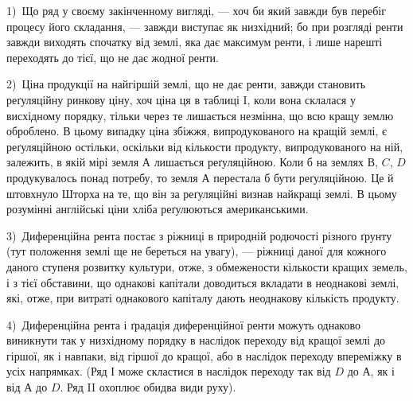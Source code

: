 
1)~Що ряд у своєму закінченному вигляді, — хоч би який завжди був перебіг процесу його складання, —
завжди виступає як низхідний; бо при розгляді ренти завжди виходять спочатку від землі, яка дає
максимум ренти, і лише нарешті переходять до тієї, що не дає жодної ренти.

2)~Ціна продукції на найгіршій землі, що не дає ренти, завжди становить реґуляційну ринкову ціну,
хоч ціна ця в таблиці I, коли вона склалася у висхідному порядку, тільки через те лишається
незмінна, що всю кращу землю оброблено. В цьому випадку ціна збіжжя, випродукованого на кращій
землі, є реґуляційною остільки, оскільки від кількости продукту, випродукованого на ній, залежить, в
якій мірі земля $А$ лишається реґуляційною. Коли б на землях $В$, $C$, $D$ продукувалось понад потребу, то
земля $А$ перестала б бути реґуляційною. Це й штовхнуло Шторха на те, що він за реґуляційні визнав
найкращі землі. В цьому розумінні англійські ціни хліба реґулюються американськими.

3)~Диференційна рента постає з ріжниці в природній родючості різного ґрунту (тут положення землі ще
не береться на увагу), — ріжниці даної для кожного даного ступеня розвитку культури, отже, з
обмежености кількости кращих земель, і з тієї обставини, що однакові капітали доводиться вкладати в
неоднакові землі, які, отже, при витраті однакового капіталу дають неоднакову кількість продукту.

4)~Диференційна рента і ґрадація диференційної ренти можуть однаково виникнути так у низхідному
порядку в наслідок переходу від кращої землі до гіршої, як і навпаки, від гіршої до кращої, або в
наслідок переходу впереміжку в усіх напрямках. (Ряд І може скластися в наслідок переходу так від $D$
до $А$, як і від $А$ до $D$. Ряд II охоплює обидва види руху).

